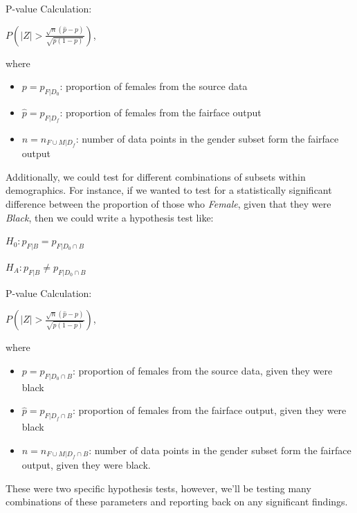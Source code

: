 \documentclass[
  letterpaper,
  DIV=11,
  numbers=noendperiod]{scrreprt}
\providecommand{\tightlist}{%
  \setlength{\itemsep}{0pt}\setlength{\parskip}{0pt}}\usepackage{longtable,booktabs,array}
\begin{document}
P-value Calculation:

\(P(|Z| > \frac{\sqrt{n}(\hat{p} - p)}{\sqrt{p(1 - p)}})\),

where

\begin{itemize}
\tightlist
\item
  \(p = p_{F|D_0}\): proportion of females from the source data
\item
  \(\hat{p} = p_{F|D_f}\): proportion of females from the fairface
  output
\item
  \(n = n_{F \cup M|D_f}\): number of data points in the gender subset
  form the fairface output
\end{itemize}

Additionally, we could test for different combinations of subsets within
demographics. For instance, if we wanted to test for a statistically
significant difference between the proportion of those who
\emph{Female}, given that they were \emph{Black}, then we could write a
hypothesis test like:

\(H_0: p_{F|B} = p_{F|D_0 \cap B}\)

\(H_A: p_{F|B} \neq p_{F|D_0 \cap B}\)

P-value Calculation:

\(P(|Z| > \frac{\sqrt{n}(\hat{p} - p)}{\sqrt{p(1 - p)}})\),

where

\begin{itemize}
\tightlist
\item
  \(p = p_{F|D_0 \cap B}\): proportion of females from the source data,
  given they were black
\item
  \(\hat{p} = p_{F|D_f \cap B}\): proportion of females from the
  fairface output, given they were black
\item
  \(n = n_{F \cup M|D_f \cap B}\): number of data points in the gender
  subset form the fairface output, given they were black.
\end{itemize}

These were two specific hypothesis tests, however, we'll be testing many
combinations of these parameters and reporting back on any significant
findings.
\end{document}
